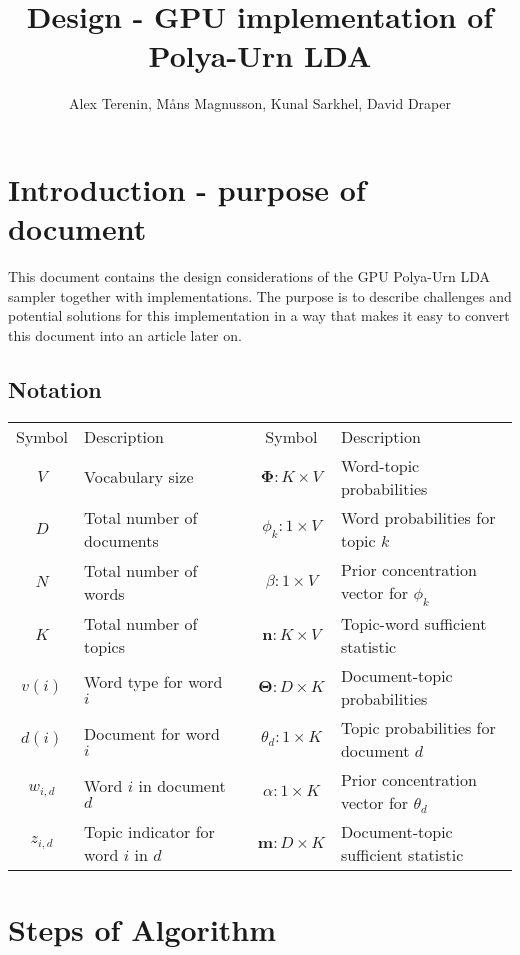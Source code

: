 \documentclass{article}
\title{Design - GPU implementation of Polya-Urn LDA}
\author{Alex Terenin, M{\aa}ns Magnusson, Kunal Sarkhel, David Draper}
\newcommand{\m}{\expandafter\mathbf} %
\begin{document}
\maketitle


\section{Introduction - purpose of document}

This document contains the design considerations of the GPU Polya-Urn LDA sampler together with implementations. The purpose is to describe challenges and potential solutions for this implementation in a way that makes it easy to convert this document into an article later on.

\subsection{Notation}

\begin{center}
\small{
\begin{tabular}{c l c c l}
\hline
Symbol & Description && Symbol & Description
\\
\cline{1-2} \cline{4-5}
$V$ & Vocabulary size && $\m{\Phi} : K \times V$ & Word-topic probabilities
\\
$D$ & Total number of documents && $\phi_k : 1 \times V$ & Word probabilities for topic $k$
\\
$N$ & Total number of words && $\beta : 1 \times V$ & Prior concentration vector for $\phi_k$
\\
$K$ & Total number of topics && $\m{n} : K \times V$ & Topic-word sufficient statistic
\\
$v(i)$ & Word type for word $i$ && $\m{\Theta} : D \times K$ & Document-topic probabilities
\\
$d(i)$ & Document for word $i$ && $\theta_d : 1 \times K$ & Topic probabilities for document $d$
\\
$w_{i,d}$ & Word $i$ in document $d$ && $\alpha : 1 \times K$ & Prior concentration vector for $\theta_d$
\\
$z_{i,d}$ & Topic indicator for word $i$ in $d$ && $\m{m} : D \times K$ & Document-topic sufficient statistic
\\
\hline
\end{tabular}
}
\end{center}

\section{Steps of Algorithm}
\end{document}

